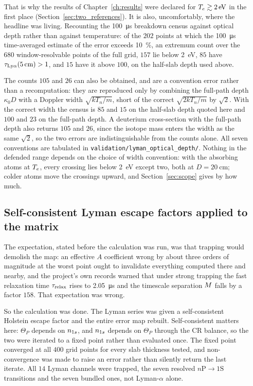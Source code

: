 That is why the results of Chapter~\ref{ch:results} were declared for
$T_e \gtrsim \SI{2}{\electronvolt}$ in the first place
(Section~\ref{sec:two_references}). It is also, uncomfortably, where the
headline was living. Recounting the \SI{100}{\micro\second} breakdown census against optical depth
rather than against temperature: of the $202$ points at which the
\SI{100}{\micro\second} time-averaged estimate of the error exceeds \SI{10}{\percent}, an extremum count over
the $680$ window-resolvable points of the full grid, $157$ lie below
\SI{2}{\electronvolt}, $85$ have
$\tau_{\rm Ly\alpha}(\SI{5}{\centi\metre}) > 1$, and $15$ have it above $100$,
on the half-slab depth used above.

The counts $105$ and $26$ can also be obtained, and are a convention error
rather than a recomputation: they are reproduced only by combining the
full-path depth $\kappa_0 D$ with a Doppler width $\sqrt{kT_n/m}$, short of the
correct $\sqrt{2kT_n/m}$ by $\sqrt{2}$. With the correct width the census is $85$ and
$15$ on the half-slab depth quoted here and $100$ and $23$ on the full-path
depth. A deuterium cross-section with the full-path depth also returns $105$
and $26$, since the isotope mass enters the width as the same $\sqrt{2}$, so
the two errors are indistinguishable from the counts alone. All seven
conventions are tabulated in \texttt{validation/lyman\_optical\_depth/}.
Nothing in the defended range depends on the choice of width convention: with
the absorbing atoms at $T_e$, every crossing lies below \SI{2}{\electronvolt}
except two, both at $D = \SI{20}{\centi\metre}$; colder atoms move the
crossings upward, and Section~\ref{sec:scope} gives by how much.

\subsection{Self-consistent Lyman escape factors applied to the matrix}

The expectation, stated before the calculation was run, was that trapping would
demolish the map: an effective $A$ coefficient wrong by about three orders of
magnitude at the worst point ought to invalidate everything computed there and
nearby, and the project's own records warned that under strong trapping the
fast relaxation time $\tau_{\mathrm{relax}}$ rises to \SI{2.05}{\micro\second} and the
timescale separation $M$ falls by a factor $158$. That expectation was
wrong.

So the calculation was done. The Lyman series was given a self-consistent
Holstein escape factor and the entire error map rebuilt. Self-consistent matters
here: $\Theta_P$ depends on $n_{1s}$, and $n_{1s}$ depends on $\Theta_P$ through the
CR balance, so the two were iterated to a fixed point rather than evaluated once.
The fixed point converged at all $400$ grid points for every slab thickness
tested, and non-convergence was made to raise an error rather than silently
return the last iterate. All $14$ Lyman channels were trapped, the seven
resolved $n\mathrm{P}\to1\mathrm{S}$ transitions and the seven bundled ones,
not Lyman-$\alpha$ alone.

